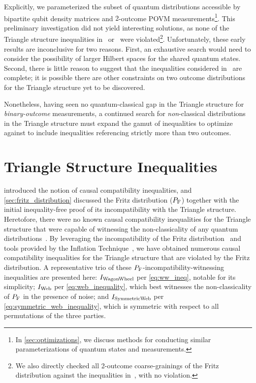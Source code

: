 \documentclass[aps, 10pt, english, twoside, pra, nofootinbib, tightenlines, longbibliography, superscriptaddress]{revtex4-1}
\begin{document}
    Explicitly, we parameterized the subset of quantum distributions accessible by bipartite qubit density matrices and $2$-outcome POVM measurements\footnote{In \cref{sec:optimizations}, we discuss methods for conducting similar parameterizations of quantum states and measurements.}. This preliminary investigation did not yield interesting solutions, as none of the Triangle structure inequalities in~\cite{Inflation} or~\cite{Henson_2014} were violated\footnote{We also directly checked all 2-outcome coarse-grainings of the Fritz distribution against the inequalities in~\cite{Inflation,Henson_2014}, with no violation.}. Unfortunately, these early results are inconclusive for two reasons. First, an exhaustive search would need to consider the possibility of larger Hilbert spaces for the shared quantum states. Second, there is little reason to suggest that the inequalities considered in~\cite{Inflation} are complete; it is possible there are other constraints on two outcome distributions for the Triangle structure yet to be discovered.

    Nonetheless, having seen no quantum-classical gap in the Triangle structure for \textit{binary-outcome} measurements, a continued search for \emph{non}-classical distributions in the Triangle structure must expand the gamut of inequalities to optimize against to include inequalities referencing strictly more than two outcomes.

    \section{Triangle Structure Inequalities}
    \label{sec:found_inequalities}

     introduced the notion of causal compatibility inequalities, and \cref{sec:fritz_distribution} discussed the Fritz distribution ($\prob[\fritz]$) together with the initial inequality-free proof of its incompatibility with the Triangle structure. Heretofore, there were no known causal compatibility inequalities for the Triangle structure that were capable of witnessing the non-classicality of any quantum distributions~\cite{Inflation}. By leveraging the incompatibility of the Fritz distribution~\cite{Fritz_2012} and tools provided by the Inflation Technique~\cite{Inflation}, we have obtained numerous causal compatibility inequalities for the Triangle structure that are violated by the Fritz distribution. A representative trio of these $\prob[\fritz]$-incompatibility-witnessing inequalities are presented here: $I_\text{WagonWheel}$ per \cref{eq:ww_ineq}, notable for its simplicity; $I_\text{Web}$ per \cref{eq:web_inequality}, which best witnesses the non-classicality of $\prob[\fritz]$ in the presence of noise; and $I_\text{SymmetricWeb}$ per \cref{eq:symmetric_web_inequality}, which is symmetric with respect to all permutations of the three parties.
\end{document}
